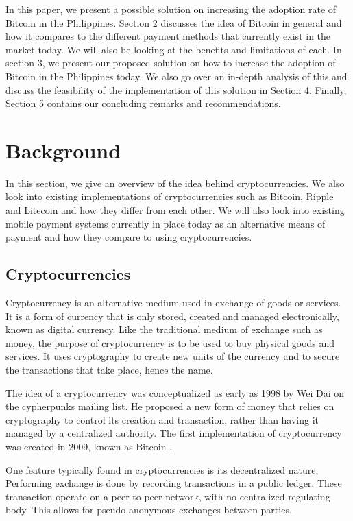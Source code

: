 \documentclass{acm_proc_article-sp}
\begin{document}
In this paper, we present a possible solution on increasing the adoption rate of Bitcoin in the Philippines. Section 2 discusses the idea of Bitcoin in general and how it compares to the different payment methods that currently exist in the market today. We will also be looking at the benefits and limitations of each. In section 3, we present our proposed solution on how to increase the adoption of Bitcoin in the Philippines today. We also go over an in-depth analysis of this and discuss the feasibility of the implementation of this solution in Section 4. Finally, Section 5 contains our concluding remarks and recommendations.


\section{Background}

In this section, we give an overview of the idea behind cryptocurrencies. We also look into existing implementations of cryptocurrencies such as Bitcoin, Ripple and Litecoin and how they differ from each other. We will also look into existing mobile payment systems currently in place today as an alternative means of payment and how they compare to using cryptocurrencies.

\subsection{Cryptocurrencies}
Cryptocurrency is an alternative medium used in exchange of goods or services. It is a form of currency that is only stored, created and managed electronically, known as digital currency. Like the traditional medium of exchange such as money, the purpose of cryptocurrency is to be used to buy physical goods and services. It uses cryptography to create new units of the currency and to secure the transactions that take place, hence the name.

The idea of a cryptocurrency was conceptualized as early as 1998 by Wei Dai on the cypherpunks mailing list. He proposed a new form of money that relies on cryptography to control its creation and transaction, rather than having it managed by a centralized authority. The first implementation of cryptocurrency was created in 2009, known as Bitcoin \cite{Bitcoin:2014}.

One feature typically found in cryptocurrencies is its decentralized nature. Performing exchange is done by recording transactions in a public ledger. These transaction operate on a peer-to-peer network, with no centralized regulating body. This allows for pseudo-anonymous exchanges between parties.
\end{document}
